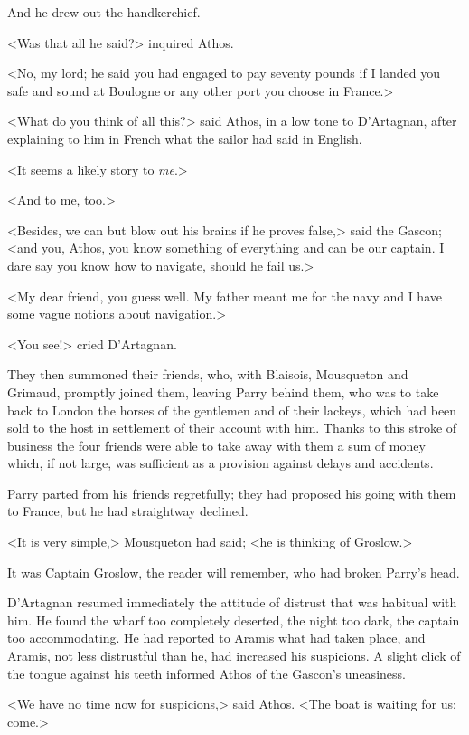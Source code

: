 And he drew out the handkerchief.

<Was that all he said?> inquired Athos.

<No, my lord; he said you had engaged to pay seventy pounds if I landed you safe and sound at Boulogne or any other port you choose in France.>

<What do you think of all this?> said Athos, in a low tone to D'Artagnan, after explaining to him in French what the sailor had said in English.

<It seems a likely story to \emph{me}.>

<And to me, too.>

<Besides, we can but blow out his brains if he proves false,> said the Gascon; <and you, Athos, you know something of everything and can be our captain. I dare say you know how to navigate, should he fail us.>

<My dear friend, you guess well. My father meant me for the navy and I have some vague notions about navigation.>

<You see!> cried D'Artagnan.

They then summoned their friends, who, with Blaisois, Mousqueton and Grimaud, promptly joined them, leaving Parry behind them, who was to take back to London the horses of the gentlemen and of their lackeys, which had been sold to the host in settlement of their account with him. Thanks to this stroke of business the four friends were able to take away with them a sum of money which, if not large, was sufficient as a provision against delays and accidents.

Parry parted from his friends regretfully; they had proposed his going with them to France, but he had straightway declined.

<It is very simple,> Mousqueton had said; <he is thinking of Groslow.>

It was Captain Groslow, the reader will remember, who had broken Parry's head.

D'Artagnan resumed immediately the attitude of distrust that was habitual with him. He found the wharf too completely deserted, the night too dark, the captain too accommodating. He had reported to Aramis what had taken place, and Aramis, not less distrustful than he, had increased his suspicions. A slight click of the tongue against his teeth informed Athos of the Gascon's uneasiness.

<We have no time now for suspicions,> said Athos. <The boat is waiting for us; come.>

